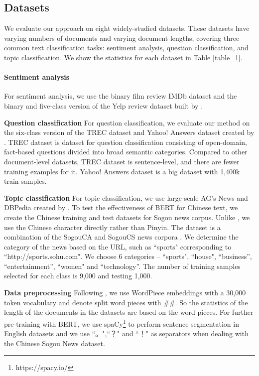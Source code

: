 \documentclass[11pt,a4paper]{article}
\theoremstyle{definition}
\begin{document}
\begin{CJK*}{UTF8}{gbsn}
	\subsection{Datasets} \label{s_1}
	We evaluate our approach on eight widely-studied datasets. These datasets have varying numbers of documents and varying document lengths, covering three common text classification tasks: sentiment analysis, question classification, and topic classification. We show the statistics for each dataset in Table \ref{table_1}.
	
	\paragraph{Sentiment analysis}
	\quad For sentiment analysis, we use the binary film review IMDb dataset \cite{maas2011learning} and the binary and five-class version of the Yelp review dataset built by \citet{zhang2015character}.
	
	{\noindent \textbf{Question classification}}
	\quad For question classification, we evaluate our method on the six-class version of the TREC dataset \cite{voorhees1999trec} and Yahoo! Answers dataset created by \citet{zhang2015character}. TREC dataset is dataset for question classification consisting of open-domain, fact-based questions divided into broad semantic categories. Compared to other document-level datasets, TREC dataset is sentence-level, and there are fewer training examples for it. Yahoo! Answers dataset is a big dataset with 1,400k train samples.
	
    {\noindent \textbf{Topic classification}}
	\quad For topic classification, we use large-scale AG's News and DBPedia created by \citet{zhang2015character}. To test the effectiveness of BERT for Chinese text, we create the Chinese training and test datasets for Sogou news corpus. Unlike \citet{zhang2015character}, we use the Chinese character directly rather than Pinyin. The dataset is a combination of the SogouCA and SogouCS news corpora \cite{wang2008automatic}. We determine the category of the news based on the URL, such as ``sports" corresponding to ``http://sports.sohu.com". We choose 6 categories – ``sports", ``house", ``business”, ``entertainment”, ``women" and ``technology”. The number of training samples selected for each class is 9,000 and testing 1,000.
	
	{\noindent \textbf{Data preprocessing}}
	\quad Following \citet{devlin2018bert}, we use WordPiece embeddings \cite{wu2016google} with a 30,000 token vocabulary and denote split word pieces with \#\#. So the statistics of the length of the documents in the datasets are based on the word pieces. For further pre-training with BERT, we use spaCy\footnote{https://spacy.io/} to perform sentence segmentation in English datasets and we use ``。",``？" and ``！" as separators when dealing with the Chinese Sogou News dataset.
	

\end{CJK*}
\end{document}
